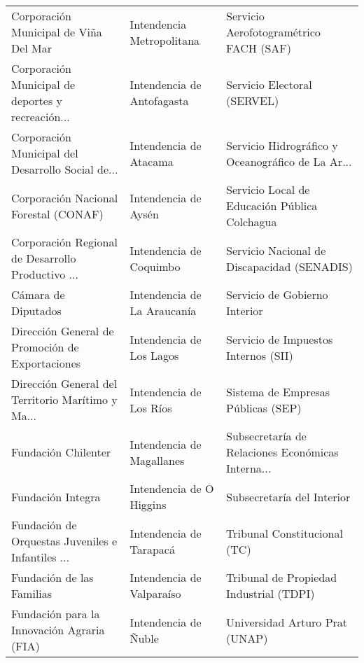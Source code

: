 \documentclass[11pt]{article}
\begin{document}
\begin{longtable}{ p{5cm} | p{5cm} | p{5cm} }
             Corporación Municipal de Viña Del Mar &                          Intendencia Metropolitana &             Servicio Aerofotogramétrico FACH (SAF) \\
 Corporación Municipal de deportes y recreación... &                         Intendencia de Antofagasta &                        Servicio Electoral (SERVEL) \\
 Corporación Municipal del Desarrollo Social de... &                             Intendencia de Atacama &  Servicio Hidrográfico y Oceanográfico de La Ar... \\
             Corporación Nacional Forestal (CONAF) &                               Intendencia de Aysén &      Servicio Local de Educación Pública Colchagua \\
 Corporación Regional de Desarrollo Productivo ... &                            Intendencia de Coquimbo &        Servicio Nacional de Discapacidad (SENADIS) \\
                               Cámara de Diputados &                        Intendencia de La Araucanía &                      Servicio de Gobierno Interior \\
   Dirección General de Promoción de Exportaciones &                           Intendencia de Los Lagos &               Servicio de Impuestos Internos (SII) \\
 Dirección General del Territorio Marítimo y Ma... &                            Intendencia de Los Ríos &                 Sistema de Empresas Públicas (SEP) \\
                               Fundación Chilenter &                          Intendencia de Magallanes &  Subsecretaría de Relaciones Económicas Interna... \\
                                 Fundación Integra &                           Intendencia de O Higgins &                         Subsecretaría del Interior \\
 Fundación de Orquestas Juveniles e Infantiles ... &                            Intendencia de Tarapacá &                       Tribunal Constitucional (TC) \\
                         Fundación de las Familias &                          Intendencia de Valparaíso &            Tribunal de Propiedad Industrial (TDPI) \\
        Fundación para la Innovación Agraria (FIA) &                               Intendencia de Ñuble &                     Universidad Arturo Prat (UNAP) \\

\end{longtable}
\end{document}
